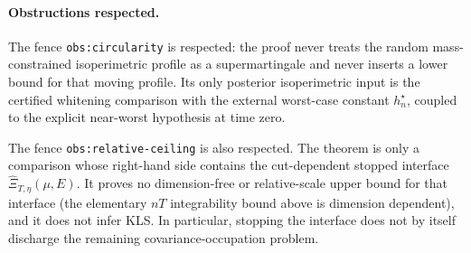 \documentclass[../main.tex]{subfiles}
\begin{document}
\paragraph{Obstructions respected.}
The fence \texttt{obs:circularity} is respected: the proof never treats the random
mass-constrained isoperimetric profile as a supermartingale and never inserts a lower bound
for that moving profile.  Its only posterior isoperimetric input is the certified whitening
comparison with the external worst-case constant $h_n^\star$, coupled to the explicit
near-worst hypothesis at time zero.

The fence \texttt{obs:relative-ceiling} is also respected.  The theorem is only a comparison
whose right-hand side contains the cut-dependent stopped interface
$\widehat\Xi_{T,\eta}(\mu,E)$.  It proves no dimension-free or relative-scale upper bound for
that interface (the elementary $nT$ integrability bound above is dimension dependent), and it
does not infer KLS.  In particular, stopping the interface does not by itself discharge the
remaining covariance-occupation problem.
\end{document}
